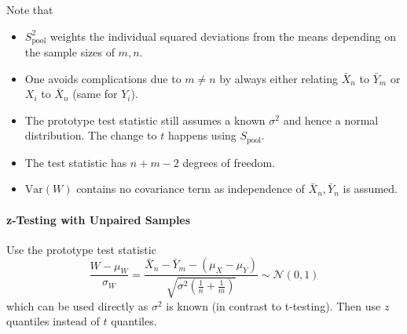 
Note that
\begin{itemize}
    \item $S_{\text{pool}}^2$ weights the individual squared deviations from the means depending on the sample sizes of $m,n$.
    \item One avoids complications due to $m \neq n$ by always either relating $\bar{X}_n$ to $\bar{Y}_m$ or $X_i$ to $\bar{X}_n$ (same for $Y_i$).
    \item The prototype test statistic still assumes a known $\sigma^2$ and hence a normal distribution. The change to $t$ happens using $S_\text{pool}$.
    \item The test statistic has $n+m-2$ degrees of freedom.
    \item $\mathrm{Var}(W)$ contains no covariance term as independence of $\bar{X}_n,\bar{Y}_n$ is assumed.
\end{itemize}

\paragraph{z-Testing with Unpaired Samples}

Use the prototype test statistic
\begin{equation*}
    \frac{W-\mu_W}{\sigma_W}=\frac{\bar{X}_n-\bar{Y}_m-(\mu_X-\mu_Y)}{\sqrt{\sigma^2\left(\frac{1}{n}+\frac{1}{m}\right)}}\sim\mathcal{N}(0,1)
\end{equation*}
which can be used directly as $\sigma^2$ is known (in contrast to t-testing).
Then use $z$ quantiles instead of $t$ quantiles.
